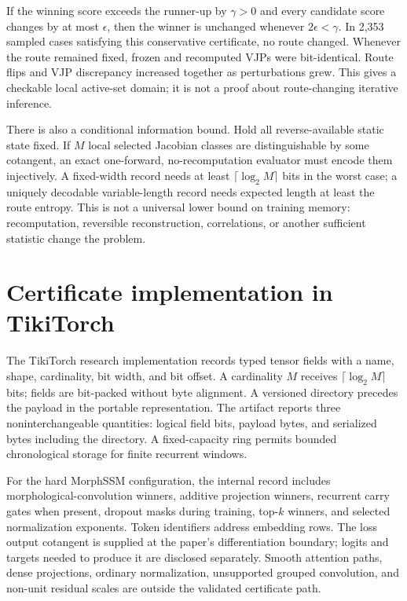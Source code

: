 \documentclass[10pt]{article}
\begin{document}
If the winning score exceeds the runner-up by $\gamma>0$ and every candidate
score changes by at most $\epsilon$, then the winner is unchanged whenever
$2\epsilon<\gamma$.  In 2,353 sampled cases satisfying this conservative
certificate, no route changed.  Whenever the route remained fixed, frozen and
recomputed VJPs were bit-identical.  Route flips and VJP discrepancy increased
together as perturbations grew.  This gives a checkable local active-set
domain; it is not a proof about route-changing iterative inference.

There is also a conditional information bound.  Hold all reverse-available
static state fixed.  If $M$ local selected Jacobian classes are distinguishable
by some cotangent, an exact one-forward, no-recomputation evaluator must encode
them injectively.  A fixed-width record needs at least
$\lceil\log_2M\rceil$ bits in the worst case; a uniquely decodable
variable-length record needs expected length at least the route entropy.  This
is not a universal lower bound on training memory: recomputation, reversible
reconstruction, correlations, or another sufficient statistic change the
problem.

\section{Certificate implementation in TikiTorch}

The TikiTorch research implementation records typed tensor fields with a name,
shape, cardinality, bit width, and bit offset.  A cardinality $M$ receives
$\lceil\log_2M\rceil$ bits; fields are bit-packed without byte alignment.  A
versioned directory precedes the payload in the portable representation.  The
artifact reports three noninterchangeable quantities: logical field bits,
payload bytes, and serialized bytes including the directory.  A fixed-capacity
ring permits bounded chronological storage for finite recurrent windows.

For the hard MorphSSM configuration, the internal record includes
morphological-convolution winners, additive projection winners, recurrent
carry gates when present, dropout masks during training, top-$k$ winners, and
selected normalization exponents.  Token identifiers address embedding rows.
The loss output cotangent is supplied at the paper's differentiation boundary;
logits and targets needed to produce it are disclosed separately.  Smooth
attention paths, dense projections, ordinary normalization, unsupported
grouped convolution, and non-unit residual scales are outside the validated
certificate path.
\end{document}
